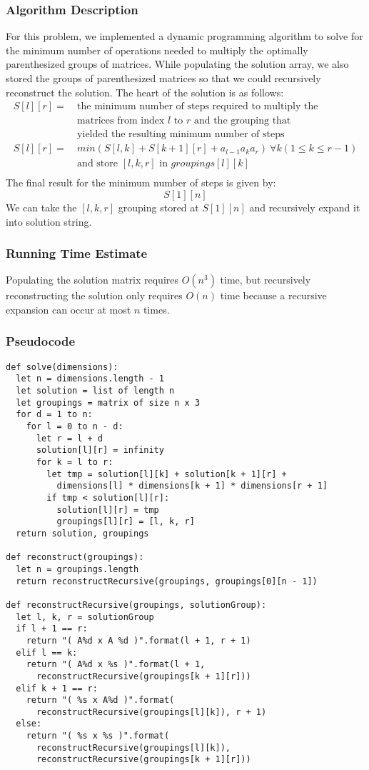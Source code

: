 \documentclass{math}
\begin{document}
\subsubsection*{Algorithm Description}
For this problem, we implemented a dynamic programming algorithm to solve for
the minimum number of operations needed to multiply the optimally parenthesized
groups of matrices. While populating the solution array, we also stored the
groups of parenthesized matrices so that we could recursively reconstruct the
solution. The heart of the solution is as follows:
\begin{align*}
  S[l][r] =~ & \text{the minimum number of steps required to multiply the} \\
  & \text{matrices from index } l \text{ to } r \text{ and the grouping that} \\
  & \text{yielded the resulting minimum number of steps}\\
  S[l][r] =~ &
    min(S[l,k] + S[k+1][r] + a_{l-1}a_ka_r)~\forall{k} (1\le k\le r-1) \\
  & \text{and store } [l, k, r] \text{ in } groupings[l][k] \\
\end{align*}
The final result for the minimum number of steps is given by:
\[ S[1][n] \]
We can take the \( [l,k,r] \) grouping stored at \( S[1][n] \) and recursively
expand it into solution string.

\subsubsection*{Running Time Estimate}
Populating the solution matrix requires \( O(n^3) \) time, but recursively
reconstructing the solution only requires \( O(n) \) time because a recursive
expansion can occur at most \( n \) times.

\subsubsection*{Pseudocode}
\begin{lstlisting}
def solve(dimensions):
  let n = dimensions.length - 1
  let solution = list of length n
  let groupings = matrix of size n x 3
  for d = 1 to n:
    for l = 0 to n - d:
      let r = l + d
      solution[l][r] = infinity
      for k = l to r:
        let tmp = solution[l][k] + solution[k + 1][r] +
          dimensions[l] * dimensions[k + 1] * dimensions[r + 1]
        if tmp < solution[l][r]:
          solution[l][r] = tmp
          groupings[l][r] = [l, k, r]
  return solution, groupings

def reconstruct(groupings):
  let n = groupings.length
  return reconstructRecursive(groupings, groupings[0][n - 1])

def reconstructRecursive(groupings, solutionGroup):
  let l, k, r = solutionGroup
  if l + 1 == r:
    return "( A%d x A %d )".format(l + 1, r + 1)
  elif l == k:
    return "( A%d x %s )".format(l + 1,
      reconstructRecursive(groupings[k + 1][r]))
  elif k + 1 == r:
    return "( %s x A%d )".format(
      reconstructRecursive(groupings[l][k]), r + 1)
  else:
    return "( %s x %s )".format(
      reconstructRecursive(groupings[l][k]),
      reconstructRecursive(groupings[k + 1][r]))
\end{lstlisting}
\end{document}
